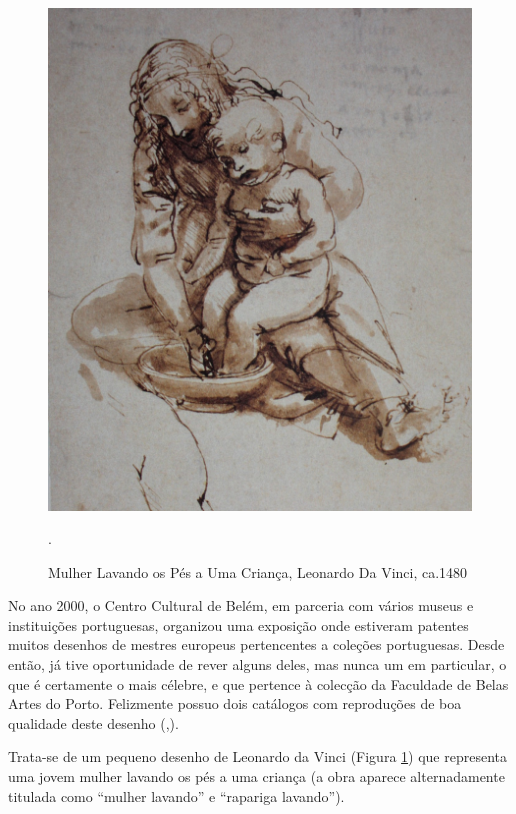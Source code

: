 \documentclass{article}
\begin{document}
\begin{figure}
\centering\includegraphics[height=0.3\textheight,keepaspectratio]
                          {mulher-lavando.jpg}
  \caption{Mulher Lavando os Pés a Uma Criança, Leonardo Da Vinci, ca.1480}.
  \label{fig:4}
\end{figure}

No ano 2000, o Centro Cultural de Belém, em parceria com vários museus
e instituições portuguesas, organizou uma exposição onde estiveram
patentes muitos desenhos de mestres europeus pertencentes a coleções
portuguesas. Desde então, já tive oportunidade de rever alguns deles,
mas nunca um em particular, o que é certamente o mais célebre, e que
pertence à colecção da Faculdade de Belas Artes do Porto. Felizmente
possuo dois catálogos com reproduções de boa qualidade deste desenho
(\cite{desenhos-europeus},\cite{desenhos-porto}).

Trata-se de um pequeno desenho de Leonardo da Vinci (Figura
\ref{fig:4}) que representa uma jovem mulher lavando os pés a uma
criança (a obra aparece alternadamente titulada como ``mulher
lavando'' e ``rapariga lavando'').
\end{document}
